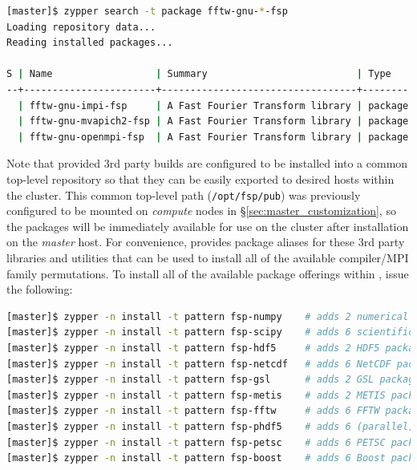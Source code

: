\documentclass[letterpaper]{article}
\begin{document}
\begin{lstlisting}[language=bash]
[master]$ zypper search -t package fftw-gnu-*-fsp
Loading repository data...
Reading installed packages...

S | Name                  | Summary                          | Type   
--+-----------------------+----------------------------------+--------
  | fftw-gnu-impi-fsp     | A Fast Fourier Transform library | package
  | fftw-gnu-mvapich2-fsp | A Fast Fourier Transform library | package
  | fftw-gnu-openmpi-fsp  | A Fast Fourier Transform library | package
\end{lstlisting}

Note that \FSP{} provided 3rd party builds are configured to be installed
into a common top-level repository so that they can be easily exported to
desired hosts within the cluster. This common top-level path
(\texttt{/opt/fsp/pub}) was previously configured to be mounted on {\em
  compute} nodes in \S\ref{sec:master_customization}, so the packages will be
immediately available for use on the cluster after installation on the {\em
  master} host.  For convenience, \FSP{} provides package aliases for these 3rd
party libraries and utilities that can be used to install all of the available
compiler/MPI family permutations. To install all of the available package
offerings within \FSP{}, issue the following:

\begin{lstlisting}[language=bash,keywords={},upquote=true]
[master]$ zypper -n install -t pattern fsp-numpy    # adds 2 numerical python packages
[master]$ zypper -n install -t pattern fsp-scipy    # adds 6 scientific python packages
[master]$ zypper -n install -t pattern fsp-hdf5     # adds 2 HDF5 packages
[master]$ zypper -n install -t pattern fsp-netcdf   # adds 6 NetCDF packages
[master]$ zypper -n install -t pattern fsp-gsl      # adds 2 GSL packages
[master]$ zypper -n install -t pattern fsp-metis    # adds 2 METIS packages
[master]$ zypper -n install -t pattern fsp-fftw     # adds 6 FFTW packages
[master]$ zypper -n install -t pattern fsp-phdf5    # adds 6 (parallel) HDF5 packages
[master]$ zypper -n install -t pattern fsp-petsc    # adds 6 PETSC packages
[master]$ zypper -n install -t pattern fsp-boost    # adds 6 Boost packages
\end{lstlisting}

\end{document}
